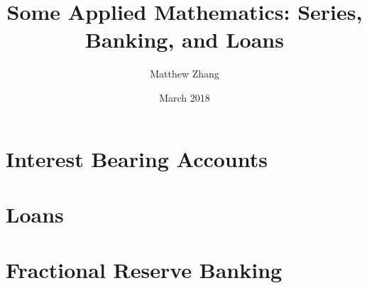 \documentclass{article}
\title{Some Applied Mathematics: Series, Banking, and Loans}
\author{Matthew Zhang}
\date{March 2018}
\begin{document}
\maketitle


\section*{Interest Bearing Accounts}

\section*{Loans}

\section*{Fractional Reserve Banking}
\end{document}
